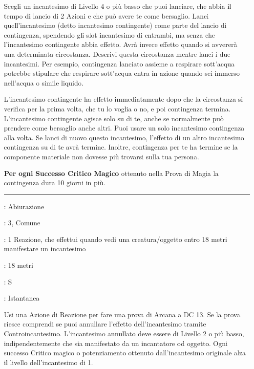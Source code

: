 \begin{multicols}{2}
Scegli un incantesimo di Livello 4 o più basso che puoi lanciare, che abbia il tempo di lancio di 2 Azioni e che può avere te come bersaglio. Lanci quell'incantesimo (detto incantesimo contingente) come parte del lancio di contingenza, spendendo gli slot incantesimo di entrambi, ma senza che l'incantesimo contingente abbia effetto. Avrà invece effetto quando si avvererà una determinata circostanza. Descrivi questa circostanza mentre lanci i due incantesimi. Per esempio, contingenza lanciato assieme a respirare sott'acqua potrebbe stipulare che respirare sott'acqua entra in azione quando sei immerso nell'acqua o simile liquido.

L'incantesimo contingente ha effetto immediatamente dopo che la circostanza si verifica per la prima volta, che tu lo voglia o no, e poi contingenza termina. L'incantesimo contingente agisce solo su di te, anche se normalmente può prendere come bersaglio anche altri. Puoi usare un solo incantesimo contingenza alla volta. Se lanci di nuovo questo incantesimo, l'effetto di un altro incantesimo contingenza su di te avrà termine. Inoltre, contingenza per te ha termine se la componente materiale non dovesse più trovarsi sulla tua persona.

\textbf{Per ogni Successo Critico Magico} ottenuto nella Prova di Magia la contingenza dura 10 giorni in più.

\smallskip\noindent\rule{\linewidth}{2pt} \hypertarget{Controincantesimo}{}\medskip{}
\noindent
\begin{description}[noitemsep, topsep=0pt, parsep=0pt, partopsep=0pt, leftmargin=0cm, labelwidth=2.8cm]
	\item[\textbf{Lista di Magia}]: Abiurazione
	\item[\textbf{Livello}]: 3, Comune
	\item[\textbf{T. di Lancio}]: 1 Reazione, che effettui quando vedi una creatura/oggetto entro 18 metri manifestare un incantesimo
	\item[\textbf{Gittata}]: 18 metri
	\item[\textbf{Componenti}]: S
	\item[\textbf{Durata}]: Istantanea
\end{description}

Usi una Azione di Reazione per fare una prova di Arcana a DC 13. Se la prova riesce comprendi se puoi annullare l'effetto dell'incantesimo tramite Controincantesimo. L'incantesimo annullato deve essere di Livello 2 o più basso, indipendentemente che sia manifestato da un incantatore od oggetto. Ogni successo Critico magico o potenziamento ottenuto dall'incantesimo originale alza il livello dell'incantesimo di 1.


\end{multicols}
